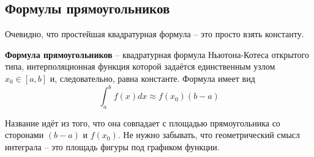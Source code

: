\documentclass[../main.tex]{subfile}
\begin{document}
\subsection{Формулы прямоугольников}
Очевидно, что простейшая квадратурная формула -- это просто взять константу.

\begin{define}\label{eq:rectangle_rule}
	\textbf{Формула прямоугольников} -- квадратурная формула Ньютона-Котеса
	открытого типа, интерполяционная функция которой задаётся единственным
	узлом $x_0\in[a,b]$ и, следовательно, равна константе. Формула имеет вид
	\[\boxed{\int_{a}^{b}f(x)dx\approx f(x_0)(b-a)}\]
\end{define}

Название идёт из того, что она совпадает с площадью прямоугольника со сторонами
$(b-a)$ и $f(x_0)$. Не нужно забывать, что геометрический смысл интеграла -- это
площадь фигуры под графиком функции.
\end{document}
